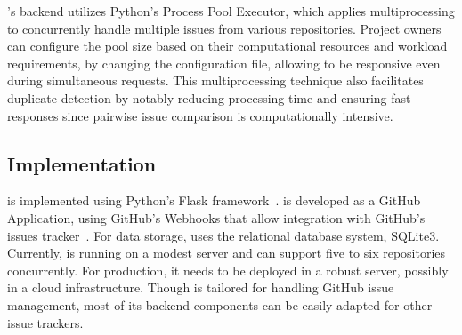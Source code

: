 \toolname's backend utilizes Python's Process Pool Executor, which applies multiprocessing to concurrently handle multiple issues from various repositories. Project owners can configure the pool size based on their computational resources and workload requirements, by changing the configuration file, allowing \toolname to be responsive even during simultaneous requests. This multiprocessing technique also facilitates duplicate detection by notably reducing processing time and ensuring fast responses since pairwise issue comparison is computationally intensive.


\subsection{Implementation}
\toolname is implemented using Python's Flask framework~\cite{pythonFlask}. \toolname is developed as a GitHub Application, using GitHub’s Webhooks that allow integration with GitHub’s issues tracker~\cite{webhookDoc}. For data storage, \toolname uses the relational database system, SQLite3. Currently, \toolname is running on a modest server and can support five to six repositories concurrently.  For production, it needs to be deployed in a robust server, possibly in a cloud infrastructure. Though \toolname is tailored for handling GitHub issue management, most of its backend components can be easily adapted for other issue trackers.
